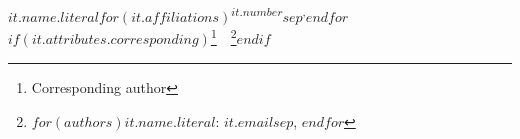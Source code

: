 $it.name.literal$$for(it.affiliations)$\textsuperscript{$it.number$}$sep$\textsuperscript{,}$endfor$$if(it.attributes.corresponding)$\thanks{Corresponding author}~~\thanks{$for(authors)$$it.name.literal$: $it.email$$sep$, $endfor$}$endif$
